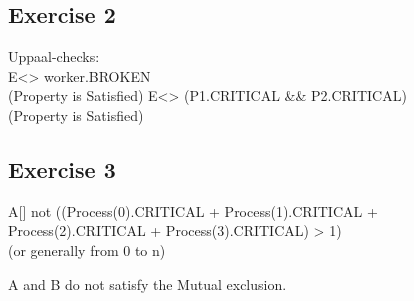 \documentclass{scrartcl}
\begin{document}
\subsection*{Exercise 2}
Uppaal-checks: \\
E<> worker.BROKEN \\
(Property is Satisfied)
E<> (P1.CRITICAL \&\& P2.CRITICAL) \\
(Property is Satisfied)


\subsection*{Exercise 3}

A[] not ((Process(0).CRITICAL + Process(1).CRITICAL + Process(2).CRITICAL + Process(3).CRITICAL) > 1) \\
(or generally from 0 to n)

A and B do not satisfy the Mutual exclusion.
\end{document}
